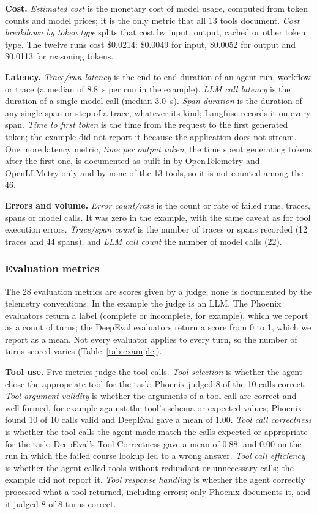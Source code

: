 \documentclass[conference]{IEEEtran}
\begin{document}
\textbf{Cost.} \emph{Estimated cost} is the monetary cost of model usage, computed from token counts and model prices; it is the only metric that all 13 tools document. \emph{Cost breakdown by token type} splits that cost by input, output, cached or other token type. The twelve runs cost \$0.0214: \$0.0049 for input, \$0.0052 for output and \$0.0113 for reasoning tokens.

\textbf{Latency.} \emph{Trace/run latency} is the end-to-end duration of an agent run, workflow or trace (a median of 8.8~s per run in the example). \emph{LLM call latency} is the duration of a single model call (median 3.0~s). \emph{Span duration} is the duration of any single span or step of a trace, whatever its kind; Langfuse records it on every span. \emph{Time to first token} is the time from the request to the first generated token; the example did not report it because the application does not stream. One more latency metric, \emph{time per output token}, the time spent generating tokens after the first one, is documented as built-in by OpenTelemetry and OpenLLMetry only and by none of the 13 tools, so it is not counted among the 46.

\textbf{Errors and volume.} \emph{Error count/rate} is the count or rate of failed runs, traces, spans or model calls. It was zero in the example, with the same caveat as for tool execution errors. \emph{Trace/span count} is the number of traces or spans recorded (12 traces and 44 spans), and \emph{LLM call count} the number of model calls (22).

\subsubsection{Evaluation metrics}
The 28 evaluation metrics are scores given by a judge; none is documented by the telemetry conventions. In the example the judge is an LLM. The Phoenix evaluators return a label (complete or incomplete, for example), which we report as a count of turns; the DeepEval evaluators return a score from 0 to 1, which we report as a mean. Not every evaluator applies to every turn, so the number of turns scored varies (Table~\ref{tab:example}).

\textbf{Tool use.} Five metrics judge the tool calls. \emph{Tool selection} is whether the agent chose the appropriate tool for the task; Phoenix judged 8 of the 10 calls correct. \emph{Tool argument validity} is whether the arguments of a tool call are correct and well formed, for example against the tool's schema or expected values; Phoenix found 10 of 10 calls valid and DeepEval gave a mean of 1.00. \emph{Tool call correctness} is whether the tool calls the agent made match the calls expected or appropriate for the task; DeepEval's Tool Correctness gave a mean of 0.88, and 0.00 on the run in which the failed course lookup led to a wrong answer. \emph{Tool call efficiency} is whether the agent called tools without redundant or unnecessary calls; the example did not report it. \emph{Tool response handling} is whether the agent correctly processed what a tool returned, including errors; only Phoenix documents it, and it judged 8 of 8 turns correct.
\end{document}
